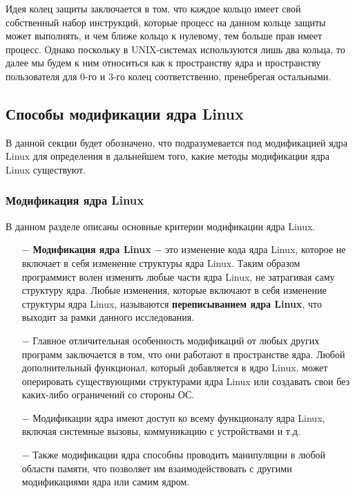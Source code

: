 
Идея колец защиты заключается в том, что каждое кольцо имеет свой собственный набор инструкций, которые процесс на данном кольце защиты может выполнять, и чем ближе кольцо к нулевому, тем больше прав имеет процесс.
Однако поскольку в UNIX-системах используются лишь два кольца, то далее мы будем к ним относиться как к пространству ядра и пространству пользователя для 0-го и 3-го колец соответственно, пренебрегая остальными.

\subsection{Способы модификации ядра Linux}\label{sec:--anal--methods}

В данной секции будет обозначено, что подразумевается под модификацией ядра Linux для определения в дальнейшем того, какие методы модификации ядра Linux существуют.

\subsubsection{Модификация ядра Linux}\label{subsec:--anal--methods--mod}

В данном разделе описаны основные критерии модификации ядра Linux.

\begin{itemize}
    \item[$-$] \textbf{Модификация ядра Linux} $-$ это изменение кода ядра Linux, которое не включает в себя изменение структуры ядра Linux.
    Таким образом программист волен изменять любые части ядра Linux, не затрагивая саму структуру ядра.
    Любые изменения, которые включают в себя изменение структуры ядра Linux, называются \textbf{переписыванием ядра Linux}, что выходит за рамки данного исследования.
    \item[$-$] Главное отличительная особенность модификаций от любых других программ заключается в том, что они работают в пространстве ядра.
    Любой дополнительный функционал, который добавляется в ядро Linux, может оперировать существующими структурами ядра Linux или создавать свои без каких-либо ограничений со стороны ОС.
    \item[$-$] Модификации ядра имеют доступ ко всему функционалу ядра Linux, включая системные вызовы, коммуникацию с устройствами и т.д.
    \item[$-$] Также модификации ядра способны проводить манипуляции в любой области памяти, что позволяет им взаимодействовать с другими модификациями ядра или самим ядром.
\end{itemize}

